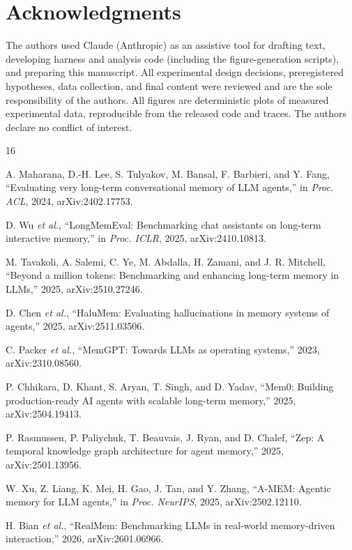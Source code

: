 \documentclass[journal]{IEEEtran}
\begin{document}
\section*{Acknowledgments}

The authors used Claude (Anthropic) \cite{claude} as an assistive tool
for drafting text, developing harness and analysis code (including the
figure-generation scripts), and preparing this manuscript. All
experimental design decisions, preregistered hypotheses, data collection,
and final content were reviewed and are the sole responsibility of the
authors. All figures are deterministic plots of measured experimental
data, reproducible from the released code and traces. The authors declare
no conflict of interest.

\begin{thebibliography}{16}

A. Maharana, D.-H. Lee, S. Tulyakov, M. Bansal, F. Barbieri, and Y. Fang,
``Evaluating very long-term conversational memory of LLM agents,'' in
\emph{Proc. ACL}, 2024, arXiv:2402.17753.

D. Wu \emph{et al.}, ``LongMemEval: Benchmarking chat assistants on long-term
interactive memory,'' in \emph{Proc. ICLR}, 2025, arXiv:2410.10813.

M. Tavakoli, A. Salemi, C. Ye, M. Abdalla, H. Zamani, and J. R. Mitchell,
``Beyond a million tokens: Benchmarking and enhancing long-term memory in
LLMs,'' 2025, arXiv:2510.27246.

D. Chen \emph{et al.}, ``HaluMem: Evaluating hallucinations in memory systems
of agents,'' 2025, arXiv:2511.03506.

C. Packer \emph{et al.}, ``MemGPT: Towards LLMs as operating systems,'' 2023,
arXiv:2310.08560.

P. Chhikara, D. Khant, S. Aryan, T. Singh, and D. Yadav, ``Mem0: Building
production-ready AI agents with scalable long-term memory,'' 2025,
arXiv:2504.19413.

P. Rasmussen, P. Paliychuk, T. Beauvais, J. Ryan, and D. Chalef, ``Zep: A
temporal knowledge graph architecture for agent memory,'' 2025,
arXiv:2501.13956.

W. Xu, Z. Liang, K. Mei, H. Gao, J. Tan, and Y. Zhang, ``A-MEM: Agentic
memory for LLM agents,'' in \emph{Proc. NeurIPS}, 2025, arXiv:2502.12110.

H. Bian \emph{et al.}, ``RealMem: Benchmarking LLMs in real-world
memory-driven interaction,'' 2026, arXiv:2601.06966.


\end{thebibliography}
\end{document}
